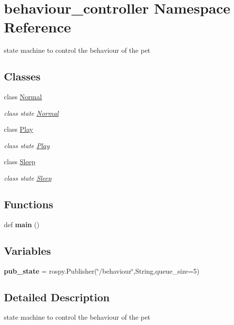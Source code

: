 \hypertarget{namespacebehaviour__controller}{}\section{behaviour\+\_\+controller Namespace Reference}
\label{namespacebehaviour__controller}


state machine to control the behaviour of the pet  


\subsection*{Classes}
\begin{DoxyCompactItemize}
\item 
class \hyperlink{classbehaviour__controller_1_1Normal}{Normal}
\begin{DoxyCompactList}\small\item\em class state \hyperlink{classbehaviour__controller_1_1Normal}{Normal} \end{DoxyCompactList}\item 
class \hyperlink{classbehaviour__controller_1_1Play}{Play}
\begin{DoxyCompactList}\small\item\em class state \hyperlink{classbehaviour__controller_1_1Play}{Play} \end{DoxyCompactList}\item 
class \hyperlink{classbehaviour__controller_1_1Sleep}{Sleep}
\begin{DoxyCompactList}\small\item\em class state \hyperlink{classbehaviour__controller_1_1Sleep}{Sleep} \end{DoxyCompactList}\end{DoxyCompactItemize}
\subsection*{Functions}
\begin{DoxyCompactItemize}
\item 
\mbox{\label{namespacebehaviour__controller_a35bfb7eb5f65e03cc1eb8e69d13c10fa}} 
def {\bfseries main} ()
\end{DoxyCompactItemize}
\subsection*{Variables}
\begin{DoxyCompactItemize}
\item 
\mbox{\label{namespacebehaviour__controller_a5b870432f520ae88808f78b28df218bf}} 
{\bfseries pub\+\_\+state} = rospy.\+Publisher(\char`\"{}/behaviour\char`\"{},String,queue\+\_\+size=5)
\end{DoxyCompactItemize}


\subsection{Detailed Description}
state machine to control the behaviour of the pet 